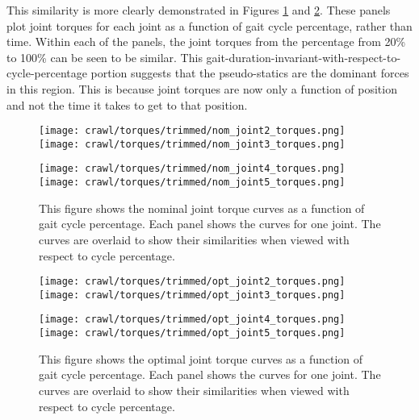 This similarity is more clearly demonstrated in Figures \ref{fig:vrep_nom_joint_torques_by_joint_over_cycle1}
and \ref{fig:vrep_opt_joint_torques_by_joint_over_cycle1}. These panels plot joint torques
for each joint as a function of gait cycle percentage, rather than time. Within each of the
panels, the joint torques from the percentage from 20\% to 100\% can be seen to be
similar. This gait-duration-invariant-with-respect-to-cycle-percentage portion suggests that
the pseudo-statics are the dominant forces in this region. This is because joint torques
are now only a function of position and not the time it takes to get to that position.

\begin{figure}
  \centerline{
    \texttt{[image: crawl/torques/trimmed/nom\_joint2\_torques.png]}
    \texttt{[image: crawl/torques/trimmed/nom\_joint3\_torques.png]}
  }
  \centerline{
    \texttt{[image: crawl/torques/trimmed/nom\_joint4\_torques.png]}
    \texttt{[image: crawl/torques/trimmed/nom\_joint5\_torques.png]}
  }
  \caption{This figure shows the nominal joint torque curves as a function of gait cycle percentage.
           Each panel shows the curves for one joint. The curves are overlaid to show their
           similarities when viewed with respect to cycle percentage.}
  \label{fig:vrep_nom_joint_torques_by_joint_over_cycle1}
\end{figure}

\begin{figure}
  \centerline{
    \texttt{[image: crawl/torques/trimmed/opt\_joint2\_torques.png]}
    \texttt{[image: crawl/torques/trimmed/opt\_joint3\_torques.png]}
  }
  \centerline{
    \texttt{[image: crawl/torques/trimmed/opt\_joint4\_torques.png]}
    \texttt{[image: crawl/torques/trimmed/opt\_joint5\_torques.png]}
  }
  \caption{This figure shows the optimal joint torque curves as a function of gait cycle percentage.
           Each panel shows the curves for one joint. The curves are overlaid to show their
           similarities when viewed with respect to cycle percentage.}
  \label{fig:vrep_opt_joint_torques_by_joint_over_cycle1}
\end{figure}

